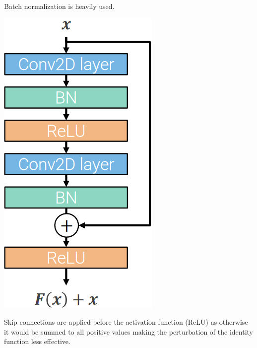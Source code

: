 \begin{description}
\begin{minipage}{0.75\linewidth}
            \begin{remark}
                Batch normalization is heavily used.
            \end{remark}
        \end{minipage}
        \begin{minipage}{0.2\linewidth}
            \centering
            \includegraphics[width=0.8\linewidth]{./img/skip_conn.png}
        \end{minipage}
        
        \begin{remark}
            Skip connections are applied before the activation function (ReLU) as otherwise it would be summed to all positive values making the perturbation of the identity function less effective.
        \end{remark}
\end{description}


